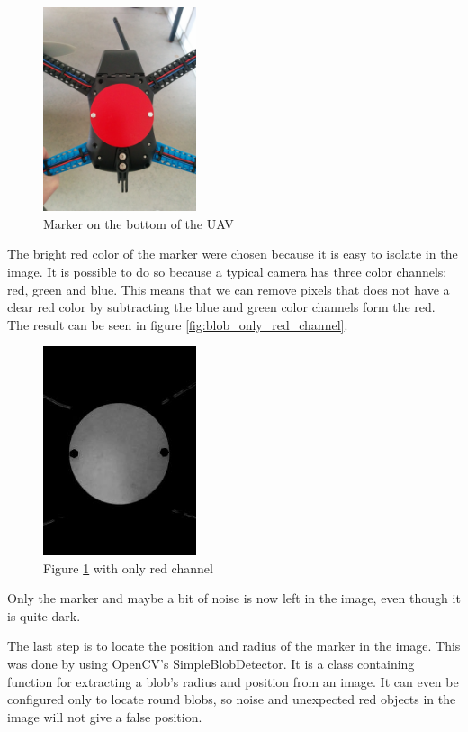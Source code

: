 \begin{figure}[H]
	\centering
	\includegraphics[width=0.4\textwidth, trim=15cm 15cm 12cm 23cm, clip=true]{imgs/blob_example}
	\caption{Marker on the bottom of the UAV}
	\label{fig:blob_example}
\end{figure}
The bright red color of the marker were chosen because it is easy to isolate in the image. It is possible to do so because a typical camera has three color channels; red, green and blue. This means that we can remove pixels that does not have a clear red color by subtracting the blue and green color channels form the red. The result can be seen in figure \vref{fig:blob_only_red_channel}.

\begin{figure}
	\centering
	\includegraphics[width=0.4\textwidth]{imgs/blob_only_red_channel}
	\caption{Figure \ref{fig:blob_example} with only red channel}
	\label{fig:blob_only_red_channel}
\end{figure}

Only the marker and maybe a bit of noise is now left in the image, even though it is quite dark. 

The last step is to locate the position and radius of the marker in the image. This was done by using OpenCV's SimpleBlobDetector. It is a class containing function for extracting a blob's radius and position from an image. It can even be configured only to locate round blobs, so noise and unexpected red objects in the image will not give a false position.


